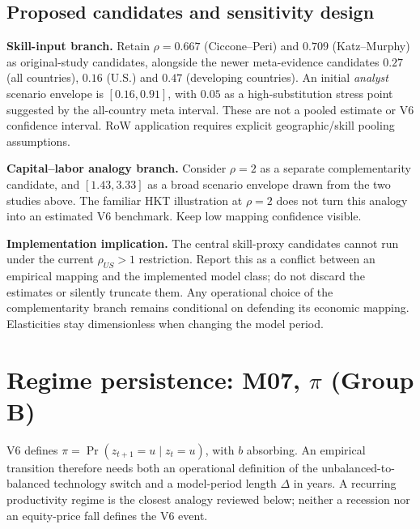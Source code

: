 \documentclass[10pt,a4paper,landscape]{article}
\begin{document}
\subsection{Proposed candidates and sensitivity design}
\textbf{Skill-input branch.} Retain $\rho=0.667$ (Ciccone--Peri) and $0.709$ (Katz--Murphy) as original-study candidates, alongside the newer meta-evidence candidates $0.27$ (all countries), $0.16$ (U.S.) and $0.47$ (developing countries). An initial \emph{analyst} scenario envelope is $[0.16,0.91]$, with $0.05$ as a high-substitution stress point suggested by the all-country meta interval. These are not a pooled estimate or V6 confidence interval. RoW application requires explicit geographic/skill pooling assumptions.

\textbf{Capital--labor analogy branch.} Consider $\rho=2$ as a separate complementarity candidate, and $[1.43,3.33]$ as a broad scenario envelope drawn from the two studies above. The familiar HKT illustration at $\rho=2$ does not turn this analogy into an estimated V6 benchmark. Keep low mapping confidence visible.

\textbf{Implementation implication.} The central skill-proxy candidates cannot run under the current $\rho_{US}>1$ restriction. Report this as a conflict between an empirical mapping and the implemented model class; do not discard the estimates or silently truncate them. Any operational choice of the complementarity branch remains conditional on defending its economic mapping. Elasticities stay dimensionless when changing the model period.


\clearpage
\section[Regime persistence: M07, pi (Group B)]{Regime persistence: M07, $\pi$ (Group B)}

V6 defines $\pi=\Pr(z_{t+1}=u\mid z_t=u)$, with $b$ absorbing.
An empirical transition therefore needs both an operational definition of the
unbalanced-to-balanced technology switch and a model-period length $\Delta$ in
years. A recurring productivity regime is the closest analogy reviewed below;
neither a recession nor an equity-price fall defines the V6 event.
\end{document}
